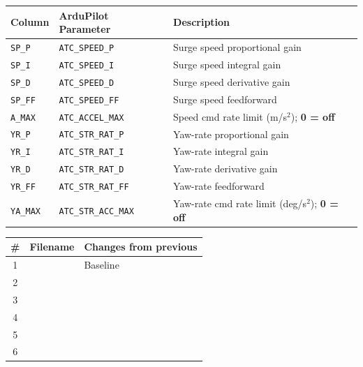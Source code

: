 \documentclass[11pt]{article}
\newcommand{\param}[1]{\texttt{\small #1}}
\begin{document}
\medskip
\noindent
\begin{tabular}{@{}lll@{}}
  \toprule
  \textbf{Column} & \textbf{ArduPilot Parameter} & \textbf{Description} \\
  \midrule
  \rowcolor{rowgray}
  \texttt{SP\_P}   & \param{ATC\_SPEED\_P}      & Surge speed proportional gain \\
  \texttt{SP\_I}   & \param{ATC\_SPEED\_I}      & Surge speed integral gain \\
  \rowcolor{rowgray}
  \texttt{SP\_D}   & \param{ATC\_SPEED\_D}      & Surge speed derivative gain \\
  \texttt{SP\_FF}  & \param{ATC\_SPEED\_FF}     & Surge speed feedforward \\
  \rowcolor{rowgray}
  \texttt{A\_MAX}  & \param{ATC\_ACCEL\_MAX}    & Speed cmd rate limit (m/s$^2$); \textbf{0 = off} \\
  \texttt{YR\_P}   & \param{ATC\_STR\_RAT\_P}   & Yaw-rate proportional gain \\
  \rowcolor{rowgray}
  \texttt{YR\_I}   & \param{ATC\_STR\_RAT\_I}   & Yaw-rate integral gain \\
  \texttt{YR\_D}   & \param{ATC\_STR\_RAT\_D}   & Yaw-rate derivative gain \\
  \rowcolor{rowgray}
  \texttt{YR\_FF}  & \param{ATC\_STR\_RAT\_FF}  & Yaw-rate feedforward \\
  \texttt{YA\_MAX} & \param{ATC\_STR\_ACC\_MAX}  & Yaw-rate cmd rate limit (deg/s$^2$); \textbf{0 = off} \\
  \bottomrule
\end{tabular}

\bigskip

\medskip
\noindent
\begin{tabularx}{\linewidth}{@{}clX@{}}
  \toprule
  \textbf{\#} & \textbf{Filename} & \textbf{Changes from previous} \\
  \midrule
  \rowcolor{rowgray}
  1 & & Baseline \\[10pt]
  2 & & \\[10pt]
  \rowcolor{rowgray}
  3 & & \\[10pt]
  4 & & \\[10pt]
  \rowcolor{rowgray}
  5 & & \\[10pt]
  6 & & \\[10pt]
  \bottomrule
\end{tabularx}
\end{document}
